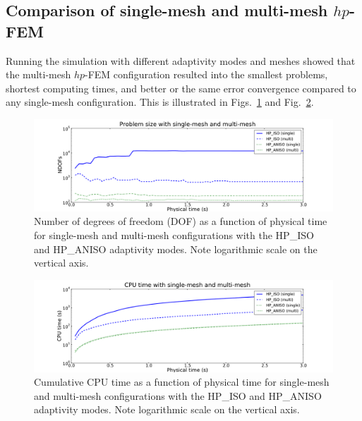 \subsection{Comparison of single-mesh and multi-mesh $hp$-FEM}

Running the simulation with different adaptivity modes 
and meshes showed that the multi-mesh $hp$-FEM configuration resulted into
the smallest problems, shortest computing times, and better or the same error 
convergence compared to any single-mesh configuration.
This is illustrated in Figs.~\ref{fig:singlemultidof} 
and Fig.~\ref{fig:singlemulticpu}.

\begin{figure}[!ht]
  \begin{centering}
  \includegraphics[width=\columnwidth]{singlemulti_dof}
  \caption{\label{fig:singlemultidof} Number of degrees of freedom (DOF) as a function 
  of physical time for single-mesh and multi-mesh configurations with the HP\_ISO
  and HP\_ANISO adaptivity modes. Note logarithmic scale on the vertical axis.}
\vspace{-6mm}
  \end{centering}
\end{figure}


\begin{figure}[!ht]
  \begin{centering}
  \includegraphics[width=\columnwidth]{singlemulti_cpu}
  \caption{\label{fig:singlemulticpu} Cumulative CPU time as a function 
  of physical time for single-mesh and multi-mesh configurations with the HP\_ISO
  and HP\_ANISO adaptivity modes. Note logarithmic scale on the vertical axis.}
  \end{centering}
\end{figure}

